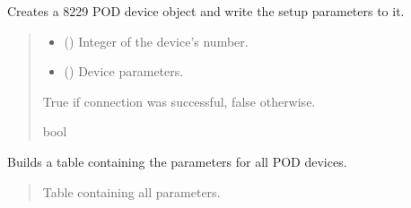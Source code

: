 \documentclass[letterpaper,10pt,english]{sphinxmanual}
\begin{document}
\begin{fulllineitems}
\begin{fulllineitems}
\label{\detokenize{Setup_8229:Setup_8229.Setup_8229._ConnectPODdevice}}
\pysigstartsignatures
{}
\pysigstopsignatures
\sphinxAtStartPar
Creates a 8229 POD device object and write the setup parameters to it.
\begin{quote}\begin{description}
\begin{itemize}
\item {} 
\sphinxAtStartPar
{} () \textendash{} Integer of the device’s number.

\item {} 
\sphinxAtStartPar
{} ({\hyperref[\detokenize{Setup_PodParameters:Setup_PodParameters.Params_8229}]{}}) \textendash{} Device parameters.

\end{itemize}

\sphinxAtStartPar
True if connection was successful, false otherwise.

\sphinxAtStartPar
bool

\end{description}\end{quote}

\end{fulllineitems}


\begin{fulllineitems}
\label{\detokenize{Setup_8229:Setup_8229.Setup_8229._GetPODdeviceParameterTable}}
\pysigstartsignatures
{}
\pysigstopsignatures
\sphinxAtStartPar
Builds a table containing the parameters for all POD devices.
\begin{quote}\begin{description}
\sphinxAtStartPar
Table containing all parameters.


\end{description}
\end{quote}
\end{fulllineitems}
\end{fulllineitems}
\end{document}
